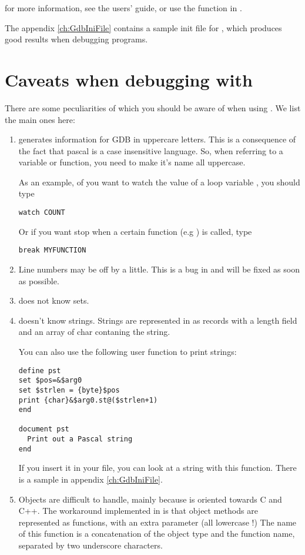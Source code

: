 \documentclass{report}
\begin{document}
for more information, see the  users' guide, or use the 
function in .

The appendix {\ref{ch:GdbIniFile}} contains a sample init file for
, which produces good results when debugging \fpc programs.

\section{Caveats when debugging with }
There are some peculiarities of \fpc which you should be aware of when using
. We list the main ones here:
\begin{enumerate}
\item \fpc generates information for GDB in uppercare letters. This is a
consequence of the fact that pascal is a case insensitive language. So, when
referring to a variable or function, you need to make it's name all
uppercase.

As an example, of you want to watch the value of a loop variable
, you should type
\begin{verbatim}
watch COUNT
\end{verbatim}
Or if you want stop when a certain function (e.g ) is called, 
type
\begin{verbatim}
break MYFUNCTION
\end{verbatim}

\item Line numbers may be off by a little. This is a bug in \fpc and will be
fixed as soon as possible.

\item {} does not know sets.

\item {} doesn't know strings. Strings are represented in  
as records with a length field and an array of char contaning the string.

You can also use the following user function to print strings:
\begin{verbatim}
define pst
set $pos=&$arg0
set $strlen = {byte}$pos
print {char}&$arg0.st@($strlen+1)
end

document pst
  Print out a Pascal string
end 
\end{verbatim}
If you insert it in your  file, you can look at a string with this
function. There is a sample  in appendix \ref{ch:GdbIniFile}.


\item Objects are difficult to handle, mainly because  is oriented
towards C and C++. The workaround implemented in \fpc is that object methods
are represented as functions, with an extra parameter  (all
lowercase !) The name of this function is a concatenation of the object type
and the function name, separated by two underscore characters.



\end{enumerate}
\end{document}
